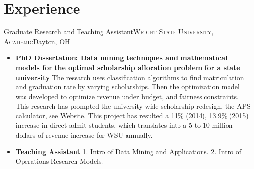 \documentclass[12pt,letterpaper,roman]{moderncv} %
\begin{document}
\section{Experience}
 {Graduate Research and Teaching
Assistant}{\textsc{Wright State University, Academic}}{Dayton, OH}{}{
\begin{itemize}
\item \textbf{PhD Dissertation: Data mining techniques and mathematical models for the optimal scholarship allocation problem for a state university}
\newline
The research uses classification algorithms to find
matriculation and graduation rate by varying scholarships. Then the
optimization model was developed to optimize revenue under budget, and fairness constraints.
This research has prompted the university wide scholarship redesign, the APS
calculator, see \href{http://www.wright.edu/raider-connect/financial-aid/first-year-scholarships}{Website}. 
This project has resulted a 11\% (2014), 13.9\% (2015) increase in direct admit
students, which translates into a 5 to 10 million dollars of revenue increase
for WSU annually.
\item \textbf{Teaching Assistant}
1. Intro of Data Mining and Applications. 
2. Intro of Operations Research Models.
\end{itemize} }


\bigskip
\end{document}
